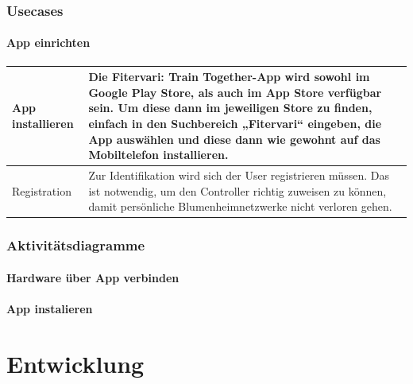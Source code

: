 \documentclass[12pt]{article}
\theoremstyle{definition}
\begin{document}
\subsubsection{Usecases}

\newpage

\paragraph{App einrichten}
\begin{center}

\end{center}
\begin{center}
\begin{tabular}{| L{3cm} | C{12cm} |}
\hline
App installieren & Die Fitervari: Train Together-App wird sowohl im Google Play Store, als auch im App Store verfügbar sein. Um diese dann im jeweiligen Store zu finden, einfach in den Suchbereich „Fitervari“ eingeben, die App auswählen und diese dann wie gewohnt auf das Mobiltelefon installieren.\\

\hline
Registration & Zur Identifikation wird sich der User registrieren müssen. Das ist notwendig, um den Controller richtig zuweisen zu können, damit persönliche Blumenheimnetzwerke nicht verloren gehen.\\


\hline
\end{tabular}
\end{center}

\pagebreak
\subsubsection{Aktivitätsdiagramme}
\paragraph{Hardware über App verbinden}
\begin{center}

\end{center}

\paragraph{App instalieren}
\begin{center}

\end{center}

\pagebreak
\section{Entwicklung}
\end{document}
